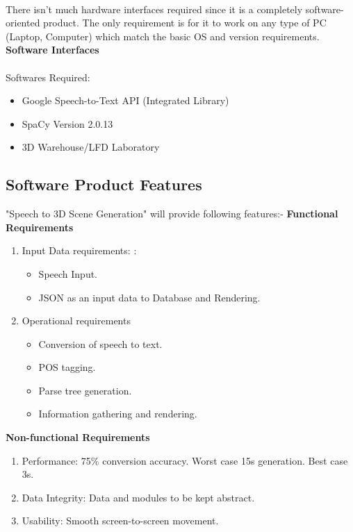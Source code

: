 \paragraph{} There isn’t much hardware interfaces required since it is a completely software-oriented product. The only requirement is for it to work on any type of PC (Laptop, Computer) which match the basic OS and version requirements.\\
\newline
\textbf{Software Interfaces}
\paragraph{}Softwares Required:
\begin{itemize}
  \item Google Speech-to-Text API (Integrated Library)
  \item SpaCy Version 2.0.13
  \item 3D Warehouse/LFD Laboratory
\end{itemize}
\subsection{Software Product Features}"Speech to 3D Scene Generation" will provide following features:-\newline
\textbf{Functional Requirements}
\begin{enumerate}
  \item Input Data requirements: :
\begin{itemize}
\item Speech Input.
\item JSON as an input data to Database and Rendering.
\end{itemize}
\item Operational requirements
\begin{itemize}
\item Conversion of speech to text.
\item POS tagging.
\item Parse tree generation.
\item Information gathering and rendering.
\end{itemize}
\end{enumerate}
\textbf{Non-functional Requirements}
\begin{enumerate}
  \item Performance: 75\% conversion accuracy. Worst case 15s generation. Best case 3s.
 \item Data Integrity: Data and modules to be kept abstract.
 \item Usability: Smooth screen-to-screen movement.

\end{enumerate}

